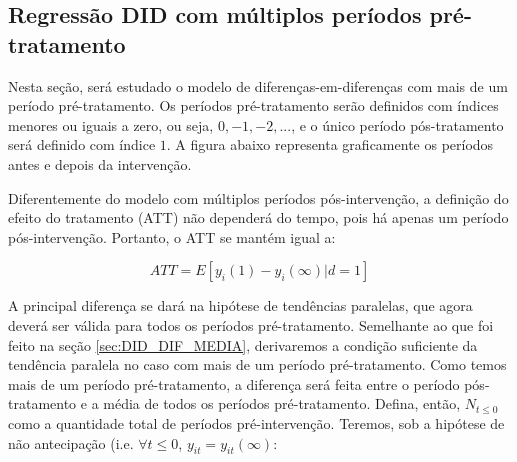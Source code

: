 \documentclass[portugues]{article}
\begin{document}
\subsection{Regressão DID com múltiplos períodos pré-tratamento}

Nesta seção, será estudado o modelo de diferenças-em-diferenças com mais de um período pré-tratamento. Os períodos pré-tratamento serão definidos com índices menores ou iguais a zero, ou seja, $0, -1, -2, ...$, e o único período pós-tratamento será definido com índice $1$. A figura abaixo representa graficamente os períodos antes e depois da intervenção.

\begin{figure}[!htp]
    \centering
\end{figure}

Diferentemente do modelo com múltiplos períodos pós-intervenção, a definição do efeito do tratamento (ATT) não dependerá do tempo, pois há apenas um período pós-intervenção. Portanto, o ATT se mantém igual a:

$$ ATT = E[y_i(1) - y_i(\infty) | d=1] $$

A principal diferença se dará na hipótese de tendências paralelas, que agora deverá ser válida para todos os períodos pré-tratamento. Semelhante ao que foi feito na seção \ref{sec:DID_DIF_MEDIA}, derivaremos a condição suficiente da tendência paralela no caso com mais de um período pré-tratamento. Como temos mais de um período pré-tratamento, a diferença será feita entre o período pós-tratamento e a média de todos os períodos pré-tratamento. Defina, então, $N_{t\leq 0}$ como a quantidade total de períodos pré-intervenção. Teremos, sob a hipótese de não antecipação (i.e. $\forall t \leq 0$, $y_{it} = y_{it}(\infty)$:
\end{document}
